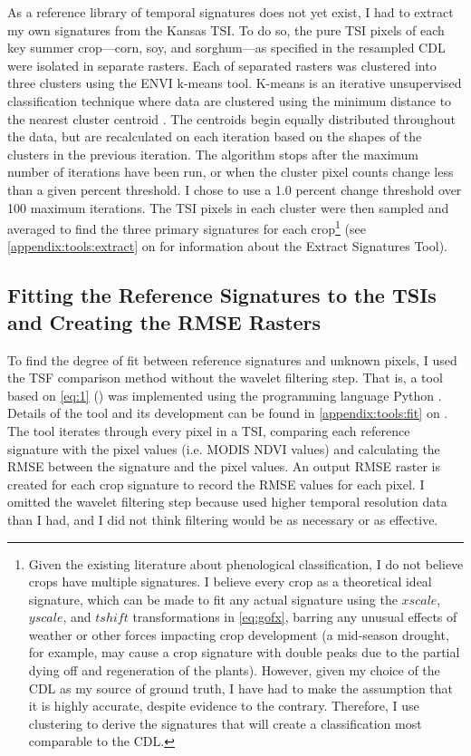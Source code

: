 As a reference library of temporal signatures does not yet exist, I had to extract my own signatures from the Kansas TSI. To do so, the pure TSI pixels of each key summer crop---corn, soy, and sorghum---as specified in the resampled CDL were isolated in separate rasters. Each of separated rasters was clustered into three clusters using the ENVI \autocite{envi5.0} k-means tool. K-means is an iterative unsupervised classification technique where data are clustered using the minimum distance to the nearest cluster centroid \autocites{kmeans2014}{matteucciclustering:}. The centroids begin equally distributed throughout the data, but are recalculated on each iteration based on the shapes of the clusters in the previous iteration. The algorithm stops after the maximum number of iterations have been run, or when the cluster pixel counts change less than a given percent threshold. I chose to use a 1.0 percent change threshold over 100 maximum iterations. The TSI pixels in each cluster were then sampled and averaged to find the three primary signatures for each crop\footnote{Given the existing literature about phenological classification, I do not believe crops have multiple signatures. I believe every crop as a theoretical ideal signature, which can be made to fit any actual signature using the $xscale$, $yscale$, and $tshift$ transformations in \autoref{eq:gofx}, barring any unusual effects of weather or other forces impacting crop development (a mid-season drought, for example, may cause a crop signature with double peaks due to the partial dying off and regeneration of the plants). However, given my choice of the CDL as my source of ground truth, I have had to make the assumption that it is highly accurate, despite evidence to the contrary.%
Therefore, I use clustering to derive the signatures that will create a classification most comparable to the CDL.} (see \autoref{appendix:tools:extract} on  for information about the Extract Signatures Tool).


\subsection{Fitting the Reference Signatures to the TSIs and Creating the RMSE Rasters}

To find the degree of fit between reference signatures and unknown pixels, I used the TSF comparison method without the wavelet filtering step. That is, a tool based on \autoref{eq:1} () was implemented using the programming language Python \autocite{python2.7.8}. Details of the tool and its development can be found in \autoref{appendix:tools:fit} on . The tool iterates through every pixel in a TSI, comparing each reference signature with the pixel values (i.e. MODIS NDVI values) and calculating the RMSE between the signature and the pixel values. An output RMSE raster is created for each crop signature to record the RMSE values for each pixel. I omitted the wavelet filtering step because \citeauthor{sakamoto2010a-two-step} used higher temporal resolution data than I had, and I did not think filtering would be as necessary or as effective.


